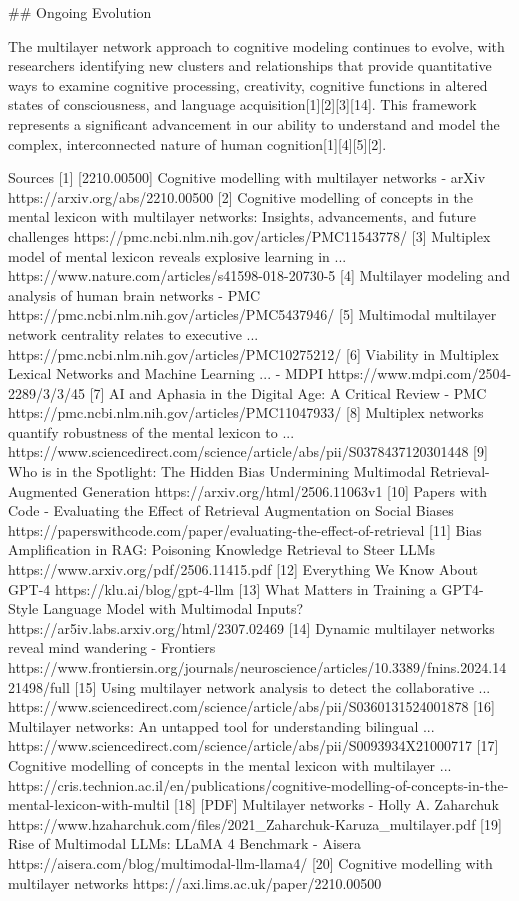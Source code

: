 ## Ongoing Evolution

The multilayer network approach to cognitive modeling continues to evolve, with researchers identifying new clusters and relationships that provide quantitative ways to examine cognitive processing, creativity, cognitive functions in altered states of consciousness, and language acquisition[1][2][3][14]. This framework represents a significant advancement in our ability to understand and model the complex, interconnected nature of human cognition[1][4][5][2].

Sources
[1] [2210.00500] Cognitive modelling with multilayer networks - arXiv https://arxiv.org/abs/2210.00500
[2] Cognitive modelling of concepts in the mental lexicon with multilayer networks: Insights, advancements, and future challenges https://pmc.ncbi.nlm.nih.gov/articles/PMC11543778/
[3] Multiplex model of mental lexicon reveals explosive learning in ... https://www.nature.com/articles/s41598-018-20730-5
[4] Multilayer modeling and analysis of human brain networks - PMC https://pmc.ncbi.nlm.nih.gov/articles/PMC5437946/
[5] Multimodal multilayer network centrality relates to executive ... https://pmc.ncbi.nlm.nih.gov/articles/PMC10275212/
[6] Viability in Multiplex Lexical Networks and Machine Learning ... - MDPI https://www.mdpi.com/2504-2289/3/3/45
[7] AI and Aphasia in the Digital Age: A Critical Review - PMC https://pmc.ncbi.nlm.nih.gov/articles/PMC11047933/
[8] Multiplex networks quantify robustness of the mental lexicon to ... https://www.sciencedirect.com/science/article/abs/pii/S0378437120301448
[9] Who is in the Spotlight: The Hidden Bias Undermining Multimodal Retrieval-Augmented Generation https://arxiv.org/html/2506.11063v1
[10] Papers with Code - Evaluating the Effect of Retrieval Augmentation on Social Biases https://paperswithcode.com/paper/evaluating-the-effect-of-retrieval
[11] Bias Amplification in RAG: Poisoning Knowledge Retrieval to Steer LLMs https://www.arxiv.org/pdf/2506.11415.pdf
[12] Everything We Know About GPT-4 https://klu.ai/blog/gpt-4-llm
[13] What Matters in Training a GPT4-Style Language Model with Multimodal Inputs? https://ar5iv.labs.arxiv.org/html/2307.02469
[14] Dynamic multilayer networks reveal mind wandering - Frontiers https://www.frontiersin.org/journals/neuroscience/articles/10.3389/fnins.2024.1421498/full
[15] Using multilayer network analysis to detect the collaborative ... https://www.sciencedirect.com/science/article/abs/pii/S0360131524001878
[16] Multilayer networks: An untapped tool for understanding bilingual ... https://www.sciencedirect.com/science/article/abs/pii/S0093934X21000717
[17] Cognitive modelling of concepts in the mental lexicon with multilayer ... https://cris.technion.ac.il/en/publications/cognitive-modelling-of-concepts-in-the-mental-lexicon-with-multil
[18] [PDF] Multilayer networks - Holly A. Zaharchuk https://www.hzaharchuk.com/files/2021_Zaharchuk-Karuza_multilayer.pdf
[19] Rise of Multimodal LLMs: LLaMA 4 Benchmark - Aisera https://aisera.com/blog/multimodal-llm-llama4/
[20] Cognitive modelling with multilayer networks https://axi.lims.ac.uk/paper/2210.00500

